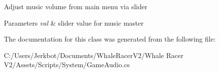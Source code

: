 Adjust music volume from main menu via slider 
\begin{DoxyParams}{Parameters}
{\em val} & slider value for music master\\
\hline
\end{DoxyParams}




The documentation for this class was generated from the following file\+:\begin{DoxyCompactItemize}
\item 
C\+:/\+Users/\+Jerkbot/\+Documents/\+Whale\+Racer\+V2/\+Whale Racer V2/\+Assets/\+Scripts/\+System/Game\+Audio.\+cs\end{DoxyCompactItemize}
